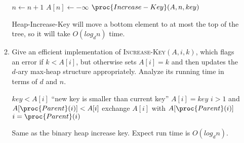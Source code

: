 \documentclass{article}
\begin{document}
\begin{enumerate}
\begin{enumerate}
        \begin{codebox}
          \li $n \gets n+1$
          \li $A[n] \gets -\infty$
          \li $\proc{Increase-Key}(A,n,key)$
        \end{codebox}

        Heap-Increase-Key will move a bottom element to at most the top of the 
        tree, so it will take $O(log_d n)$ time.

      \item Give an efficient implementation of
        \textsc{Increase-Key}$(A,i,k)$,
        which flags an error if $k < A[i]$, but otherwise sets $A[i] =
        k$ and then updates the $d$-ary max-heap structure
        appropriately.    Analyze its running time in terms of $d$
        and $n$.

        \begin{codebox}
          \li \If $key < A[i]$ \Do
          \li \Error ``new key is smaller than current key''
        \End
        \li $A[i] = key$
        \li \While $i > 1$ and $A[\proc{Parent}(i)] < A[i]$ \Do
        \li exchange $A[i]$ with $A[\proc{Parent}(i)]$
        \li $i = \proc{Parent}(i)$
        \End
        \end{codebox}
        Same as the binary heap increase key. Expect run time is $O(log_d n)$.
  \end{enumerate}
  \end{enumerate}
  
  
\end{document}
